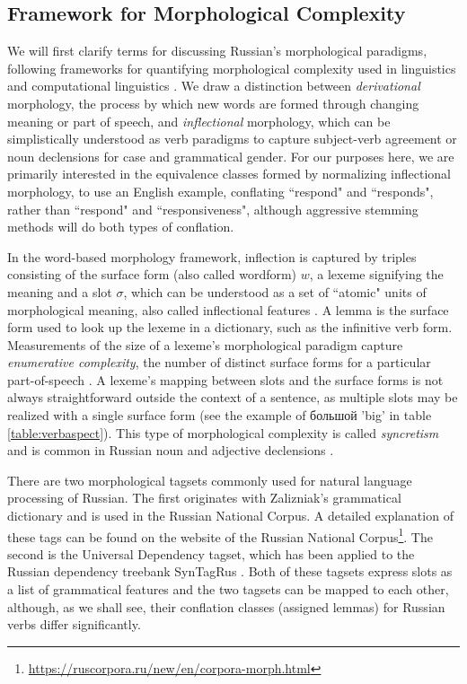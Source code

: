\documentclass[11pt,a4paper]{article}
\begin{document}
\subsection{Framework for Morphological Complexity}
We will first clarify terms for discussing Russian's morphological paradigms, following frameworks for quantifying morphological complexity used in linguistics and computational linguistics \cite{baerman2015intro, cotterell-etal-2019-complexity}. We draw a distinction between \textit{derivational} morphology, the process by which new words are formed through changing meaning or part of speech, and \textit{inflectional} morphology, which can be simplistically understood as verb paradigms to capture subject-verb agreement or noun declensions for case and grammatical gender. For our purposes here, we are primarily interested in the equivalence classes formed by normalizing inflectional morphology, to use an English example, conflating ``respond" and ``responds", rather than ``respond" and ``responsiveness", although aggressive stemming methods will do both types of conflation.

In the word-based morphology framework, inflection is captured by triples consisting of the surface form (also called wordform) $w$, a lexeme  signifying the meaning and a slot $\sigma$, which can be understood as a set of ``atomic" units of morphological meaning, also called inflectional features \cite{aronoff1976word,sylak-glassman-etal-2015-language,cotterell-etal-2019-complexity}.
A lemma is the surface form used to look up the lexeme in a dictionary, such as the infinitive verb form. Measurements of the size of a lexeme's morphological paradigm capture \textit{enumerative complexity}, the number of distinct surface forms for a particular part-of-speech \cite{cotterell-etal-2019-complexity}. A lexeme's mapping between slots and the surface forms is not always straightforward outside the context of a sentence, as multiple slots may be realized with a single surface form (see the example of \foreignlanguage{russian}{большой} 'big' in table \ref{table:verbaspect}). This type of morphological complexity is called \textit{syncretism} and is common in Russian noun and adjective declensions \cite{baerman2015understanding,Milizia2015PatternsOS}.

There are two morphological tagsets commonly used for natural language processing of Russian. The first originates with Zalizniak's grammatical dictionary and is used in the Russian National Corpus. A detailed explanation of these tags can be found on the website of the Russian National Corpus\footnote{\url{https://ruscorpora.ru/new/en/corpora-morph.html}}. The second is the Universal Dependency tagset, which has been applied to the Russian dependency treebank SynTagRus \cite{Sharoff2011ThePP,lipenkova-soucek-2014-converting,mcdonald-etal-2013-universal}. Both of these tagsets express slots as a list of grammatical features and the two tagsets can be mapped to each other, although, as we shall see, their conflation classes (assigned lemmas) for Russian verbs differ significantly.
\end{document}
